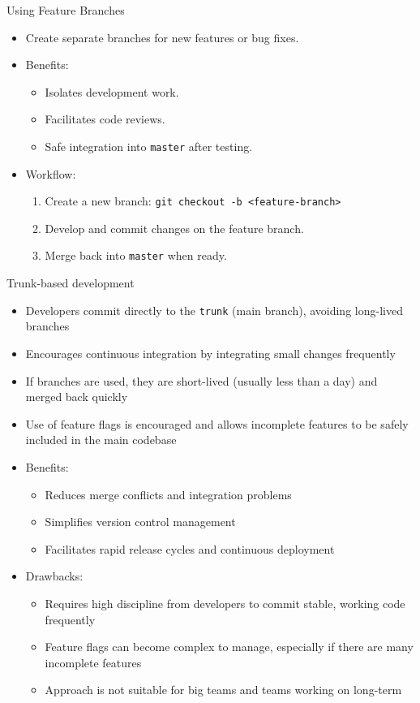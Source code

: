 \documentclass{beamer}
\begin{document}
\begin{frame}{Using Feature Branches}
  \begin{itemize}
      \item Create separate branches for new features or bug fixes.
      \item Benefits:
      \begin{itemize}
          \item Isolates development work.
          \item Facilitates code reviews.
          \item Safe integration into \texttt{master} after testing.
      \end{itemize}
      \item Workflow:
      \begin{enumerate}
          \item Create a new branch: \texttt{git checkout -b <feature-branch>}
          \item Develop and commit changes on the feature branch.
          \item Merge back into \texttt{master} when ready.
      \end{enumerate}
  \end{itemize}
\end{frame}

\begin{frame}{Trunk-based development}
  \begin{itemize}
    \item Developers commit directly to the \texttt{trunk} (main branch), avoiding long-lived branches
    \item Encourages continuous integration by integrating small changes frequently
    \item If branches are used, they are short-lived (usually less than a day) and merged back quickly
    \item Use of feature flags is encouraged and allows incomplete features to be safely included in the main codebase
    \item Benefits:
    \begin{itemize}
      \item Reduces merge conflicts and integration problems
      \item Simplifies version control management
      \item Facilitates rapid release cycles and continuous deployment
    \end{itemize}
    \item Drawbacks:
    \begin{itemize}
      \item Requires high discipline from developers to commit stable, working code frequently
      \item Feature flags can become complex to manage, especially if there are many incomplete features
      \item Approach is not suitable for big teams and teams working on long-term
    \end{itemize}
  \end{itemize}
\end{frame}
\end{document}
